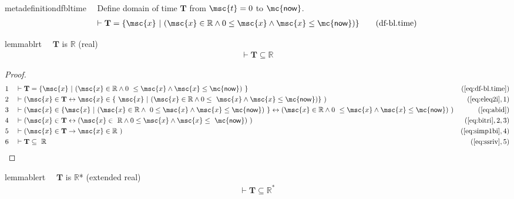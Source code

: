 \begin{restatable}{metadefinition}{dfbltime}~~ Define domain of time $\mathbf{T}$
from $\msc{t} = 0$ to $\mathsf{\mc{now}}$.
\begin{align}
\vdash \mathbf{T} = \{ \msc{x}~\vert~( \msc{x} \in \mathbb{R} \wedge 0 \le \msc{x}
    \wedge \msc{x} \le \mathsf{\mc{now}} )
    \}\label{eq:df-bl.time}\tag{df-bl.time}
\end{align}
\end{restatable}

\begin{restatable}{lemma}{blrt}~~ $\mathbf{T}$ is $\mathbb{R}$ (real)
\begin{align}
\vdash \mathbf{T} \subseteq \mathbb{R}\label{eq:bl.rt}\tag{bl.rt}
\end{align}
\end{restatable}

\begin{proof}
\begin{align}
  1 &&  & \vdash \mathbf{T} = \{ \msc{x}~\vert~( \msc{x} \in \mathbb{R} \wedge 0
     ~\le \msc{x} \wedge \msc{x} \le \mathsf{\mc{now}} )
     ~\}&(\mbox{\ref{eq:df-bl.time}})\notag
  \\ 2 &&  & \vdash ( \msc{x} \in \mathbf{T} \leftrightarrow \msc{x} \in \{
     ~\msc{x}~\vert~( \msc{x} \in \mathbb{R} \wedge 0 \le
     ~\msc{x} \wedge \msc{x} \le \mathsf{\mc{now}} ) \}
     ~)&(\mbox{\ref{eq:eleq2i}},1)\notag
  \\ 3 &&  & \vdash ( \msc{x} \in \{ \msc{x}~\vert~( \msc{x} \in \mathbb{R} \wedge
     ~0 \le \msc{x} \wedge \msc{x} \le \mathsf{\mc{now}} )
     ~\} \leftrightarrow ( \msc{x} \in \mathbb{R} \wedge 0
     ~\le \msc{x} \wedge \msc{x} \le \mathsf{\mc{now}} )
     ~)&(\mbox{\ref{eq:abid}})\notag
  \\ 4 &&  & \vdash ( \msc{x} \in \mathbf{T} \leftrightarrow ( \msc{x} \in
     ~\mathbb{R} \wedge 0 \le \msc{x} \wedge \msc{x} \le
     ~\mathsf{\mc{now}} )
     ~)&(\mbox{\ref{eq:bitri}},2,3)\notag
  \\ 5 &&  & \vdash ( \msc{x} \in \mathbf{T} \rightarrow \msc{x} \in \mathbb{R}
     ~)&(\mbox{\ref{eq:simp1bi}},4)\notag
  \\ 6 &&  & \vdash \mathbf{T} \subseteq
     ~\mathbb{R}&(\mbox{\ref{eq:ssriv}},5)\notag
\end{align}
\end{proof}

\begin{restatable}{lemma}{blert}~~ $\mathbf{T}$ is $\mathbb{R}$* (extended
real)
\begin{align}
\vdash \mathbf{T} \subseteq \mathbb{R}^{*}\label{eq:bl.ert}\tag{bl.ert}
\end{align}
\end{restatable}


